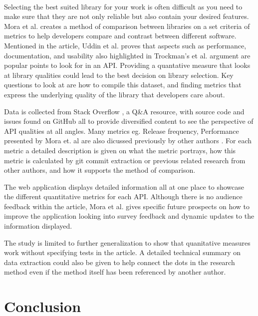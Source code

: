 \documentclass[12pt]{article}
\begin{document}
\paragraph{}
Selecting the best suited library for your work is often difficult as you need to make sure that they are not only reliable but also contain your desired features.
Mora et al. \cite{metrics} creates a method of comparison between libraries on a set criteria of metrics to help developers
compare and contrast between different software. Mentioned in the article, Uddin et al. \cite{analogical} proves that aspects
such as performance, documentation, and usability also highlighted in Trockman's et al. \cite{githubbadges} argument are
popular points to look for in an API.
Providing a quantative measure that looks at library qualities could lead to the best decision on library selection.
Key questions to look at are how to compile this dataset, and finding metrics that express the underlying quality of the library that developers care about.

Data is collected from Stack Overflow \cite{stackoverflow}, a Q\&A resource, with source code and issues found on GitHub \cite{github} all to provide
diversified content to see the perspective of API qualities at all angles. Many metrics eg. Release frequency, Performance presented by Mora et. al \cite{metrics} are also
dicussed previously by other authors \cite{apiwave,analogical,githubbadges,opinerarticle}.
For each metric a detailed description is given on what the metric portrays, how this metric is calculated by git commit extraction or previous related research from other authors,
and how it supports the method of comparison.

The web application displays detailed information all at one place to showcase the different quantitative metrics for each API. 
Although there is no audience feedback within the article, Mora et al. \cite{metrics} gives specific future prospects on how
to improve the application looking into survey feedback and dynamic updates to the information displayed. 

The study is limited to further generalization to show that quanitative measures work without specifying tests in the article. 
A detailed technical summary on data extraction could also be given to help connect the dots in the research method even if the method itself has been referenced by another author.


\newpage 
\section{Conclusion}
\end{document}
